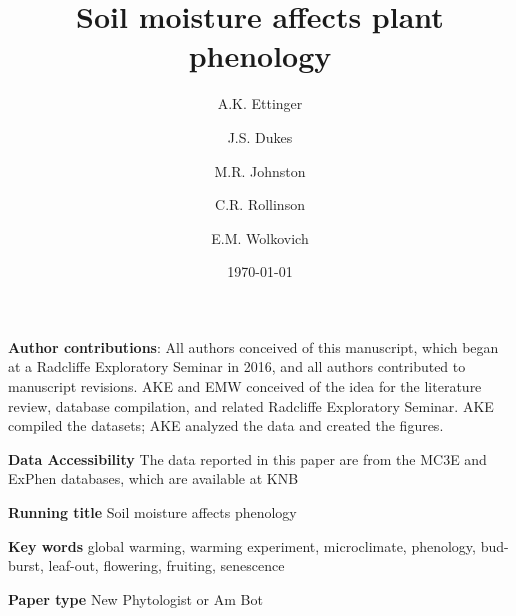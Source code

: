 \documentclass{article}
\begin{document}



\title{Soil moisture affects plant phenology} %
\author[1,2,a]{A.K. Ettinger}
\author[3,b]{J.S. Dukes}
\author[4,c]{M.R. Johnston}
\author[5,d]{C.R. Rollinson}
\author[1,4,6,e]{E.M. Wolkovich}









\date{\today}
\maketitle %
\textbf{Author contributions}: All authors conceived of this manuscript, which began at a Radcliffe Exploratory Seminar in 2016, and all authors contributed to manuscript revisions. AKE and EMW conceived of the idea for the literature review, database compilation, and related Radcliffe Exploratory Seminar. AKE compiled the datasets; AKE analyzed the data and created the figures.

\textbf{Data Accessibility} 
The data reported in this paper are from the MC3E and ExPhen databases, which are available at KNB \citep{ettinger2018,ettinger2021}

\textbf{Running title} Soil moisture affects phenology

\textbf{Key words} global warming, warming experiment, microclimate, phenology, bud-burst, leaf-out, flowering, fruiting, senescence 


\textbf{Paper type} New Phytologist or Am Bot
\end{document}
